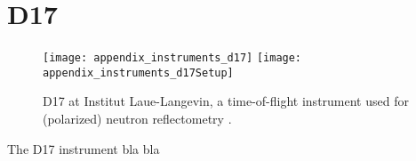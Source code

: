 \documentclass[\main/dresen_thesis.tex]{subfiles}
\begin{document}
  \section{D17}\label{ch:lss:d17}

    \begin{figure}[ht]
      \centering
      \texttt{[image: appendix\_instruments\_d17]}
      \texttt{[image: appendix\_instruments\_d17Setup]}
      \caption{\label{fig:lss:d17}D17 at Institut Laue-Langevin, a time-of-flight instrument used for (polarized) neutron reflectometry \cite{Saerbeck_2018_Recen}.}
    \end{figure}
    The D17 instrument bla bla
\end{document}
